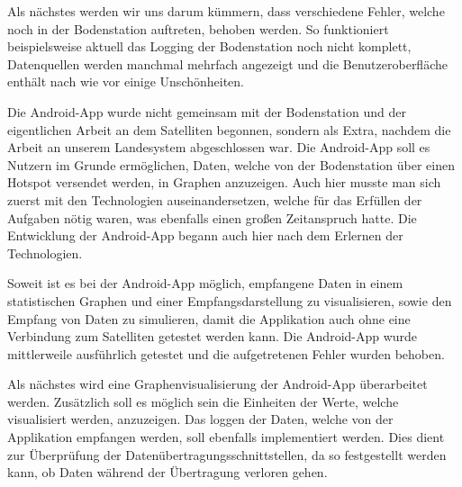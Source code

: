 Als nächstes werden wir uns darum kümmern, dass verschiedene Fehler, welche noch in der Bodenstation auftreten, behoben werden. So funktioniert beispielsweise aktuell das Logging der Bodenstation noch nicht komplett, Datenquellen werden manchmal mehrfach angezeigt und die Benutzeroberfläche enthält nach wie vor einige Unschönheiten.

Die Android-App wurde nicht gemeinsam mit der Bodenstation und der eigentlichen Arbeit an dem Satelliten begonnen, sondern als Extra, nachdem die Arbeit an unserem Landesystem abgeschlossen war. Die Android-App soll es Nutzern im Grunde ermöglichen, Daten, welche von der Bodenstation über einen Hotspot versendet werden, in Graphen anzuzeigen. Auch hier musste man sich zuerst mit den Technologien auseinandersetzen, welche für das Erfüllen der Aufgaben nötig waren, was ebenfalls einen großen Zeitanspruch hatte. Die Entwicklung der Android-App begann auch hier nach dem Erlernen der Technologien.

Soweit ist es bei der Android-App möglich, empfangene Daten in einem statistischen Graphen und einer Empfangsdarstellung zu visualisieren, sowie den Empfang von Daten zu simulieren, damit die Applikation auch ohne eine Verbindung zum Satelliten getestet werden kann. Die Android-App wurde mittlerweile ausführlich getestet und die aufgetretenen Fehler wurden behoben.

Als nächstes wird eine Graphenvisualisierung der Android-App überarbeitet werden. Zusätzlich soll es möglich sein die Einheiten der Werte, welche visualisiert werden, anzuzeigen. Das loggen der Daten, welche von der Applikation empfangen werden, soll ebenfalls implementiert werden. Dies dient zur Überprüfung der Datenübertragungsschnittstellen, da so festgestellt werden kann, ob Daten während der Übertragung verloren gehen.